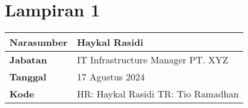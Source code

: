 \chapter*{Lampiran 1}

\begin{table}[h!]
    \centering
    \renewcommand{\arraystretch}{1.3}
    \begin{tabular}{|p{4cm}|p{10cm}|}
        \hline
        \textbf{Narasumber} & Haykal Rasidi \\
        \hline
        \textbf{Jabatan} & IT Infrastructure Manager PT. XYZ \\
        \hline
        \textbf{Tanggal} & 17 Agustus 2024 \\
        \hline
        \textbf{Kode} & HR: Haykal Rasidi \newline TR: Tio Ramadhan \\
        \hline
    \end{tabular}
\end{table}

